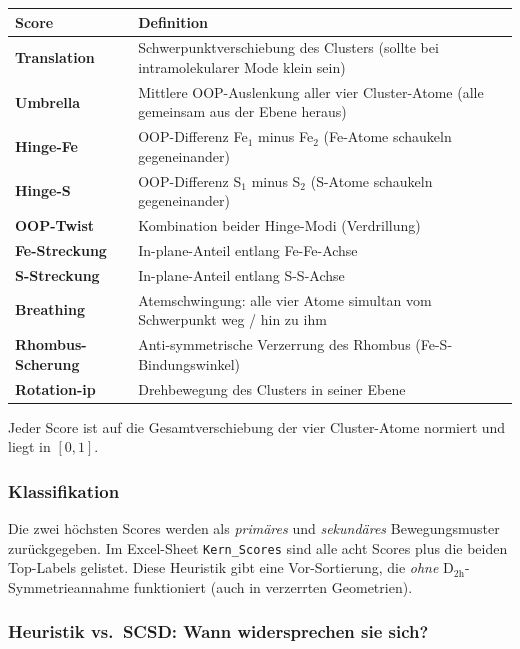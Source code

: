 \documentclass[11pt,a4paper,twoside]{article}
\theoremstyle{remark}
\begin{document}
\begin{center}
\begin{tabularx}{\textwidth}{l X}
\toprule
\textbf{Score} & \textbf{Definition} \\
\midrule
\textbf{Translation} & Schwerpunktverschiebung des Clusters
                       (sollte bei intramolekularer Mode klein sein) \\
\textbf{Umbrella}    & Mittlere OOP-Auslenkung aller vier Cluster-Atome
                       (alle gemeinsam aus der Ebene heraus) \\
\textbf{Hinge-Fe}    & OOP-Differenz Fe$_1$ minus Fe$_2$ (Fe-Atome
                       schaukeln gegeneinander) \\
\textbf{Hinge-S}     & OOP-Differenz S$_1$ minus S$_2$ (S-Atome
                       schaukeln gegeneinander) \\
\textbf{OOP-Twist}   & Kombination beider Hinge-Modi (Verdrillung) \\
\textbf{Fe-Streckung} & In-plane-Anteil entlang Fe-Fe-Achse \\
\textbf{S-Streckung} & In-plane-Anteil entlang S-S-Achse \\
\textbf{Breathing}   & Atemschwingung: alle vier Atome simultan vom
                       Schwerpunkt weg / hin zu ihm \\
\textbf{Rhombus-Scherung} & Anti-symmetrische Verzerrung des Rhombus
                       (Fe-S-Bindungswinkel) \\
\textbf{Rotation-ip} & Drehbewegung des Clusters in seiner Ebene \\
\bottomrule
\end{tabularx}
\end{center}

Jeder Score ist auf die Gesamtverschiebung der vier Cluster-Atome
normiert und liegt in $[0, 1]$.

\subsubsection*{Klassifikation}

Die zwei h\"ochsten Scores werden als \emph{prim\"ares} und
\emph{sekund\"ares} Bewegungsmuster zur\"uckgegeben. Im Excel-Sheet
\texttt{Kern\_Scores} sind alle acht Scores plus die beiden Top-Labels
gelistet. Diese Heuristik gibt eine Vor-Sortierung, die
\textit{ohne} D$_\mathrm{2h}$-Symmetrieannahme funktioniert (auch in
verzerrten Geometrien).

\subsubsection*{Heuristik vs.\ SCSD: Wann widersprechen sie sich?}
\end{document}
